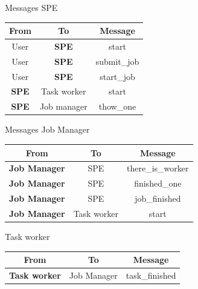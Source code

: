 \documentclass{beamer}
\begin{document}
\begin{frame}{Messages SPE}
    \begin{table}[]
        \centering
        \begin{tabular}{|c|c|c|}
        \hline
        From & To & Message \\
        \hline
        \hline
        \hline
        User & \textbf{SPE} & start \\
        User & \textbf{SPE} & submit\_job \\
        User & \textbf{SPE} &  start\_job \\
        \textbf{SPE} & Task worker & start \\
        \textbf{SPE} & Job manager &  thow\_one\\
        \hline
        \end{tabular}
    \end{table}
\end{frame}

\begin{frame}{Messages Job Manager}

    \begin{table}[]
        \centering
        \begin{tabular}{|c|c|c|}
        \hline
        From & To & Message \\
        \hline
        \hline
        \hline
        \textbf{Job Manager} & SPE & there\_is\_worker \\
        \textbf{Job Manager} & SPE & finished\_one \\
        \textbf{Job Manager} & SPE & job\_finished \\
        \textbf{Job Manager} & Task worker & start \\
        
        \hline
        \end{tabular}
    \end{table}

\end{frame}

\begin{frame}{Task worker}

    \begin{table}[]
        \centering
        \begin{tabular}{|c|c|c|}
        \hline
        From & To & Message \\
        \hline
        \hline
        \hline
        \textbf{Task worker} & Job Manager & task\_finished \\
        \hline
        \end{tabular}
    \end{table}
\end{frame}
\end{document}
